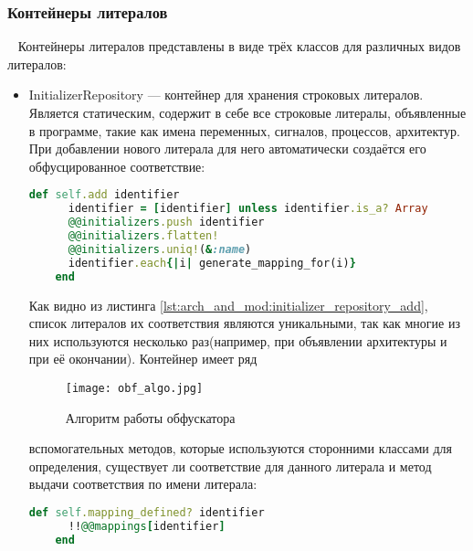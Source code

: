 \subsubsection{Контейнеры литералов}~
  Контейнеры литералов представлены в виде трёх классов для различных видов литералов:
  \begin{itemize}
  \item InitializerRepository --- контейнер для хранения строковых литералов. Является статическим, содержит в себе все строковые литералы, объявленные в программе, такие как имена переменных, сигналов, процессов, архитектур. При добавлении нового литерала для него автоматически создаётся его обфусцированное соответствие:
  \begin{lstlisting}[language=Ruby, style=rubystyle,caption={Определение метода перевода класса в строку для примитива component instantiation}, label=lst:arch_and_mod:initializer_repository_add]
    def self.add identifier
      identifier = [identifier] unless identifier.is_a? Array
      @@initializers.push identifier
      @@initializers.flatten!
      @@initializers.uniq!(&:name)
      identifier.each{|i| generate_mapping_for(i)}
    end
  \end{lstlisting}

  Как видно из листинга \ref{lst:arch_and_mod:initializer_repository_add}, список литералов их соответствия являются уникальными, так как многие из них используются несколько раз(например, при объявлении архитектуры и при её окончании).
  Контейнер имеет ряд


\begin{landscape}
\thispagestyle{lscape}
\begin{figure}[ht]
\centering
  \texttt{[image: obf\_algo.jpg]}
  \caption{ Алгоритм работы обфускатора }
  \label{fig:arch_and_mod:obf_algo}
\end{figure}
\end{landscape}

  вспомогательных методов, которые используются сторонними классами для определения, существует ли соответствие для данного литерала и метод выдачи соответствия по имени литерала:


  \begin{lstlisting}[language=Ruby, style=rubystyle,caption={Вспомогательные методы контейнера}, label=lst:arch_and_mod:support_methods]
    def self.mapping_defined? identifier
      !!@@mappings[identifier]
    end


\end{lstlisting}
\end{itemize}
